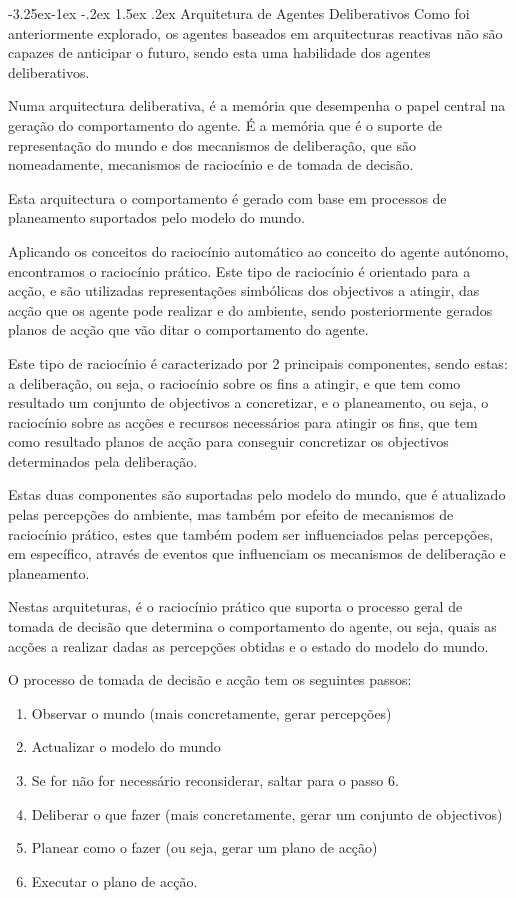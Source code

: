 \documentclass[a4paper,12pt]{article}
\makeatletter
\renewcommand\paragraph{\@startsection{paragraph}{4}{\z@}%
                {-3.25ex\@plus -1ex \@minus -.2ex}%
                {1.5ex \@plus .2ex}%
                {\normalfont\normalsize\bfseries}}
\makeatother
\begin{document}
\paragraph{Arquitetura de Agentes Deliberativos} \label{arquitetura_de_agentes_deliberativos}
Como foi anteriormente explorado, os agentes baseados em arquitecturas reactivas não são capazes de anticipar o futuro, sendo esta uma habilidade dos agentes deliberativos.

Numa arquitectura deliberativa, é a memória que desempenha o papel central na geração do comportamento do agente. É a memória que é o suporte de representação do mundo e dos mecanismos de deliberação, que são nomeadamente, mecanismos de raciocínio e de tomada de decisão.

Esta arquitectura o comportamento é gerado com base em processos de planeamento suportados pelo modelo do mundo.

Aplicando os conceitos do raciocínio automático ao conceito do agente autónomo, encontramos o raciocínio prático. Este tipo de raciocínio é orientado para a acção, e são utilizadas representações simbólicas dos objectivos a atingir, das acção que os agente pode realizar e do ambiente, sendo posteriormente gerados planos de acção que vão ditar o comportamento do agente.

Este tipo de raciocínio é caracterizado por 2 principais componentes, sendo estas: a deliberação, ou seja, o raciocínio sobre os fins a atingir, e que tem como resultado um conjunto de objectivos a concretizar, e o planeamento, ou seja, o raciocínio sobre as acções e recursos necessários para atingir os fins, que tem como resultado planos de acção para conseguir concretizar os objectivos determinados pela deliberação.

Estas duas componentes são suportadas pelo modelo do mundo, que é atualizado pelas percepções do ambiente, mas também por efeito de mecanismos de raciocínio prático, estes que também podem ser influenciados pelas percepções, em específico, através de eventos que influenciam os mecanismos de deliberação e planeamento.

Nestas arquiteturas, é o raciocínio prático que suporta o processo geral de tomada de decisão que determina o comportamento do agente, ou seja, quais as acções a realizar dadas as percepções obtidas e o estado do modelo do mundo.

O processo de tomada de decisão e acção tem os seguintes passos:
\begin{enumerate}
	\item Observar o mundo (mais concretamente, gerar percepções)
	\item Actualizar o modelo do mundo
	\item Se for não for necessário reconsiderar, saltar para o passo 6.
	\item Deliberar o que fazer (mais concretamente, gerar um conjunto de objectivos)
	\item Planear como o fazer (ou seja, gerar um plano de acção)
	\item Executar o plano de acção.
\end{enumerate}
\end{document}
